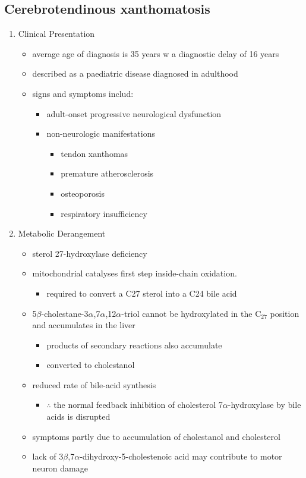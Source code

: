 \documentclass{scrartcl}
\begin{document}
\subsection{Cerebrotendinous xanthomatosis}
\label{sec:orgc34009c}
\begin{enumerate}
\item Clinical Presentation
\label{sec:orgf14fc52}
\begin{itemize}
\item average age of diagnosis is 35 years w a diagnostic delay of 16 years
\item described as a paediatric disease diagnosed in adulthood
\item signs and symptoms includ:
\begin{itemize}
\item adult-onset progressive neurological dysfunction
\item non-neurologic manifestations
\begin{itemize}
\item tendon xanthomas
\item premature atherosclerosis
\item osteoporosis
\item respiratory insufficiency
\end{itemize}
\end{itemize}
\end{itemize}

\item Metabolic Derangement
\label{sec:orgec27001}
\begin{itemize}
\item sterol 27-hydroxylase deficiency
\item mitochondrial catalyses first step inside-chain oxidation.
\begin{itemize}
\item required to convert a C27 sterol into a C24 bile acid
\end{itemize}
\item 5\(\beta\)-cholestane-3\(\alpha\),7\(\alpha\),12\(\alpha\)-triol cannot be hydroxylated in the C\(_{\text{27}}\)
position and accumulates in the liver
\begin{itemize}
\item products of secondary reactions also accumulate
\item converted to cholestanol
\end{itemize}
\item reduced rate of bile-acid synthesis
\begin{itemize}
\item \(\therefore\) the normal feedback inhibition of cholesterol
7\(\alpha\)-hydroxylase by bile acids is disrupted
\end{itemize}
\item symptoms partly due to accumulation of cholestanol and cholesterol
\item lack of 3\(\beta\),7\(\alpha\)-dihydroxy-5-cholestenoic acid may contribute to motor
neuron damage
\end{itemize}


\end{enumerate}
\end{document}
